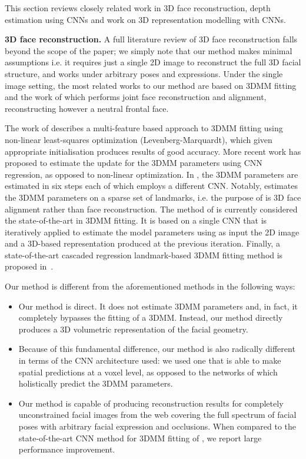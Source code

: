This section reviews closely related work in 3D face reconstruction,
depth estimation using CNNs and work on 3D representation modelling with CNNs.

\textbf{3D face reconstruction.} A full literature review of 3D face
reconstruction falls beyond the scope of the paper; we simply note
that our method makes minimal assumptions i.e. it requires just a
single 2D image to reconstruct the full 3D facial structure, and works
under arbitrary poses and expressions. Under the single image setting,
the most related works to our method are based on 3DMM fitting
\cite{blanz1999morphable, romdhani2005estimating, zhu2016face,
  jourabloo2016large, huber2016multiresolution} and the work of
\cite{liu2016joint} which performs joint face reconstruction and
alignment, reconstructing however a neutral frontal face.

The work of \cite{romdhani2005estimating} describes a multi-feature
based approach to 3DMM fitting using non-linear least-squares
optimization (Levenberg-Marquardt), which given appropriate
initialisation produces results of good accuracy. More recent work has
proposed to estimate the update for the 3DMM parameters using CNN
regression, as opposed to non-linear optimization.  In
\cite{jourabloo2016large}, the 3DMM parameters are estimated in six
steps each of which employs a different CNN. Notably,
\cite{jourabloo2016large} estimates the 3DMM parameters on a sparse
set of landmarks, i.e. the purpose of \cite{jourabloo2016large} is 3D
face alignment rather than face reconstruction. The method of
\cite{zhu2016face} is currently considered the state-of-the-art in
3DMM fitting. It is based on a single CNN that is iteratively applied to
estimate the model parameters using as input the 2D image and a
3D-based representation produced at the previous iteration.
Finally, a state-of-the-art cascaded regression landmark-based
3DMM fitting method is proposed in~\cite{huber2016multiresolution}.

Our method is different from the aforementioned methods in the following ways:
\begin{itemize}
\item Our method is direct. It does not estimate 3DMM parameters and,
  in fact, it completely bypasses the fitting of a 3DMM. Instead, our
  method directly produces a 3D volumetric representation of the
  facial geometry.
\item
Because of this fundamental difference, our method is also radically different in terms of the CNN architecture used: we used one that is able to make spatial predictions at a voxel level, as opposed to the networks of \cite{zhu2016face, jourabloo2016large} which holistically predict the 3DMM parameters.
\item
Our method is capable of producing reconstruction results for completely unconstrained facial images from the web covering the full spectrum of facial poses with arbitrary facial expression and occlusions. When compared to the state-of-the-art CNN method for 3DMM fitting of \cite{zhu2016face}, we report large performance improvement.
\end{itemize}

